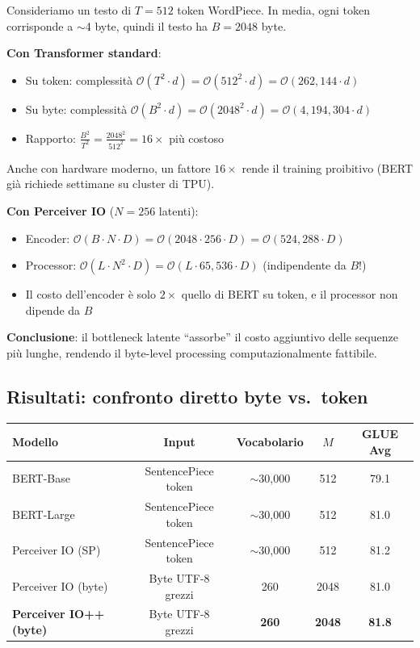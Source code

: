 \documentclass[12pt,a4paper]{article}
\begin{document}
\begin{proofbox}
Consideriamo un testo di $T = 512$ token WordPiece. In media, ogni token corrisponde a $\sim$4 byte, quindi il testo ha $B = 2048$ byte.

\textbf{Con Transformer standard}:
\begin{itemize}
    \item Su token: complessit\`a $\mathcal{O}(T^2 \cdot d) = \mathcal{O}(512^2 \cdot d) = \mathcal{O}(262{,}144 \cdot d)$
    \item Su byte: complessit\`a $\mathcal{O}(B^2 \cdot d) = \mathcal{O}(2048^2 \cdot d) = \mathcal{O}(4{,}194{,}304 \cdot d)$
    \item Rapporto: $\frac{B^2}{T^2} = \frac{2048^2}{512^2} = 16\times$ pi\`u costoso
\end{itemize}
Anche con hardware moderno, un fattore $16\times$ rende il training proibitivo (BERT gi\`a richiede settimane su cluster di TPU).

\textbf{Con Perceiver IO} ($N = 256$ latenti):
\begin{itemize}
    \item Encoder: $\mathcal{O}(B \cdot N \cdot D) = \mathcal{O}(2048 \cdot 256 \cdot D) = \mathcal{O}(524{,}288 \cdot D)$
    \item Processor: $\mathcal{O}(L \cdot N^2 \cdot D) = \mathcal{O}(L \cdot 65{,}536 \cdot D)$ (indipendente da $B$!)
    \item Il costo dell'encoder \`e solo $2\times$ quello di BERT su token, e il processor non dipende da $B$
\end{itemize}

\textbf{Conclusione}: il bottleneck latente ``assorbe'' il costo aggiuntivo delle sequenze pi\`u lunghe, rendendo il byte-level processing computazionalmente fattibile.
\end{proofbox}

\subsection{Risultati: confronto diretto byte vs.\ token}

\begin{center}
\begin{tabular}{lcccc}
\toprule
\textbf{Modello} & \textbf{Input} & \textbf{Vocabolario} & \textbf{$M$} & \textbf{GLUE Avg} \\
\midrule
BERT-Base & SentencePiece token & $\sim$30{,}000 & 512 & 79.1 \\
BERT-Large & SentencePiece token & $\sim$30{,}000 & 512 & 81.0 \\
\midrule
Perceiver IO (SP) & SentencePiece token & $\sim$30{,}000 & 512 & 81.2 \\
Perceiver IO (byte) & Byte UTF-8 grezzi & 260 & 2048 & 81.0 \\
\textbf{Perceiver IO++ (byte)} & Byte UTF-8 grezzi & \textbf{260} & \textbf{2048} & \textbf{81.8} \\
\bottomrule
\end{tabular}
\end{center}
\end{document}
